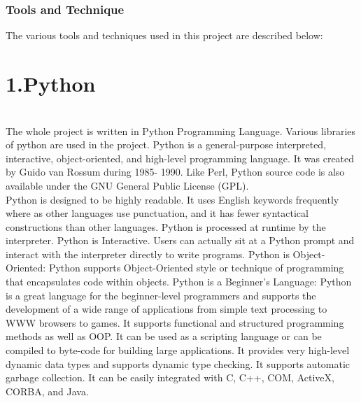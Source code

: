 \subsection{Tools and Technique}
The various tools and techniques used in this project are described below: \\
\chapter{\textbf{1.Python }}\\
The whole project is written in Python Programming Language. Various libraries of python are used in the project. Python is a general-purpose interpreted, interactive, object-oriented, and high-level programming language. It was created by Guido van Rossum during 1985- 1990. Like Perl, Python source code is also available under the GNU General Public License (GPL). \\

Python is designed to be highly readable. It uses English keywords frequently where as other languages use punctuation, and it has fewer syntactical constructions than other languages. Python is processed at runtime by the interpreter. Python is Interactive. Users can actually sit at a Python prompt and interact with the interpreter directly to write programs. Python is Object-Oriented: Python supports Object-Oriented style or technique of programming that encapsulates code within objects. Python is a Beginner's Language: Python is a great language for the beginner-level programmers and supports the development of a wide range of applications from simple text processing to WWW browsers to games. It supports functional and structured programming methods as well as OOP. It can be used as a scripting language or can be compiled to byte-code for building large applications. It provides very high-level dynamic data types and supports dynamic type checking. It supports automatic garbage collection. It can be easily integrated with C, C++, COM, ActiveX, CORBA, and Java. 

